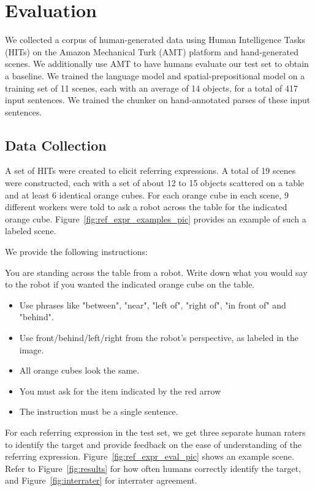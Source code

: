 \documentclass[conference]{IEEEtran}
\numberwithin{equation}{section}
\begin{document}
\section{Evaluation} 

We collected a corpus of human-generated data using Human Intelligence Tasks (HITs) on the Amazon Mechanical Turk (AMT) platform and hand-generated scenes. We additionally use AMT to have humans evaluate our test set to obtain a baseline. We trained the language model and spatial-prepositional model on a training set of 11 scenes, each with an average of 14 objects, for a total of 417 input sentences. We trained the chunker on hand-annotated parses of these input sentences.

 \subsection{Data Collection}
A set of HITs were created to elicit referring expressions. A total of 19 scenes were constructed, each with a set of about 12 to 15 objects scattered on a table and at least 6 identical orange cubes. For each orange cube in each scene, 9 different workers were told to ask a robot across the table for the indicated orange cube. Figure~\ref{fig:ref_expr_examples_pic} provides an example of such a labeled scene.

We provide the following instructions:

\begin{framed}
You are standing across the table from a robot. Write down what you would say to the robot if you wanted the indicated orange cube on the table.
\begin{itemize}[topsep=0pt,itemsep=-1ex,partopsep=1ex,parsep=1ex,leftmargin=1em]
\item Use phrases like "between", "near", "left of", "right of", "in front of" and "behind".
\item Use front/behind/left/right from the robot's perspective, as labeled in the image. 
\item All orange cubes look the same.
\item You must ask for the item indicated by the red arrow
\item The instruction must be a single sentence.
\end{itemize}
\end{framed}

For each referring expression in the test set, we get three separate human raters to identify the target and provide feedback on the ease of understanding of the referring expression. Figure~\ref{fig:ref_expr_eval_pic} shows an example scene. Refer to Figure~\ref{fig:results} for how often humans correctly identify the target, and Figure~\ref{fig:interrater} for interrater agreement.  
\end{document}
